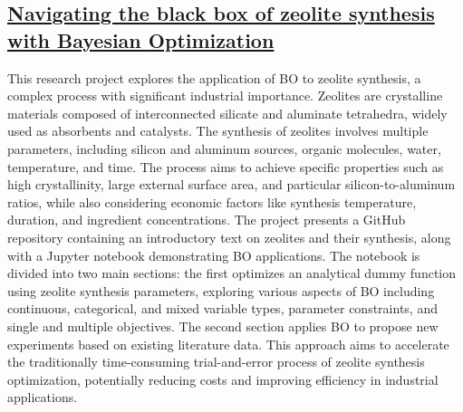  \subsection*{\href{https://www.youtube.com/watch?v=4lFEUixwkE8}{Navigating the black box of zeolite synthesis with Bayesian Optimization}}

This research project explores the application of BO to zeolite synthesis, a complex process with significant industrial importance. Zeolites are crystalline materials composed of interconnected silicate and aluminate tetrahedra, widely used as absorbents and catalysts\cite{dusselier2018small}. The synthesis of zeolites involves multiple parameters, including silicon and aluminum sources, organic molecules, water, temperature, and time. The process aims to achieve specific properties such as high crystallinity, large external surface area, and particular silicon-to-aluminum ratios, while also considering economic factors like synthesis temperature, duration, and ingredient concentrations\cite{mallette2024current}. The project presents a GitHub repository containing an introductory text on zeolites and their synthesis, along with a Jupyter notebook demonstrating BO applications. The notebook is divided into two main sections: the first optimizes an analytical dummy function using zeolite synthesis parameters, exploring various aspects of BO including continuous, categorical, and mixed variable types, parameter constraints, and single and multiple objectives. The second section applies BO to propose new experiments based on existing literature data. This approach aims to accelerate the traditionally time-consuming trial-and-error process of zeolite synthesis optimization, potentially reducing costs and improving efficiency in industrial applications.

